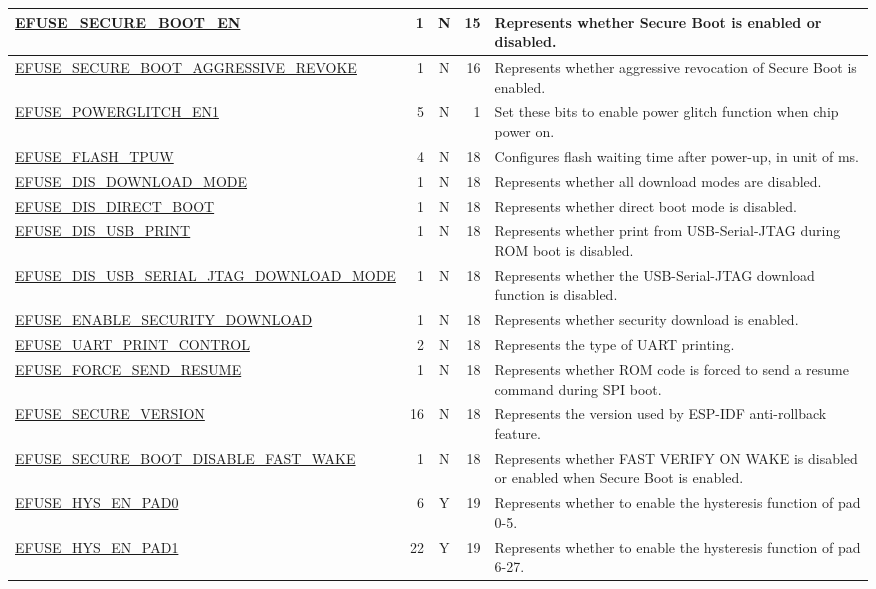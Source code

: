\begin{longtable}[l]{ |m{8.2cm}|r|c|r|m{9cm}| }
    \hyperref[fielddesc:EFUSESECUREBOOTEN]{EFUSE\_SECURE\_BOOT\_EN}  & 1 & N & 15 & Represents whether Secure Boot is enabled or disabled. \\ \hline
    \hyperref[fielddesc:EFUSESECUREBOOTAGGRESSIVEREVOKE]{EFUSE\_SECURE\_BOOT\_AGGRESSIVE\_REVOKE}  & 1 & N & 16 & Represents whether aggressive revocation of Secure Boot is enabled. \\ \hline
    \hyperref[fielddesc:EFUSEPOWERGLITCHEN1]{EFUSE\_POWERGLITCH\_EN1}  & 5 & N & 1 & Set these bits to enable power glitch function when chip power on. \\ \hline
    \hyperref[fielddesc:EFUSEFLASHTPUW]{EFUSE\_FLASH\_TPUW}  & 4 & N & 18 & Configures flash waiting time after power-up, in unit of ms. \\ \hline
    \hyperref[fielddesc:EFUSEDISDOWNLOADMODE]{EFUSE\_DIS\_DOWNLOAD\_MODE}  & 1 & N & 18 & Represents whether all download modes are disabled. \\ \hline
    \hyperref[fielddesc:EFUSEDISDIRECTBOOT]{EFUSE\_DIS\_DIRECT\_BOOT}  & 1 & N & 18 & Represents whether direct boot mode is disabled. \\ \hline
    \hyperref[fielddesc:EFUSEDISUSBPRINT]{EFUSE\_DIS\_USB\_PRINT}  & 1 & N & 18 & Represents whether print from USB-Serial-JTAG during ROM boot is disabled. \\ \hline
    \hyperref[fielddesc:EFUSEDISUSBSERIALJTAGDOWNLOADMODE]{EFUSE\_DIS\_USB\_SERIAL\_JTAG\_DOWNLOAD\_MODE}  & 1 & N & 18 & Represents whether the USB-Serial-JTAG download function is disabled. \\ \hline
    \hyperref[fielddesc:EFUSEENABLESECURITYDOWNLOAD]{EFUSE\_ENABLE\_SECURITY\_DOWNLOAD}  & 1 & N & 18 & Represents whether security download is enabled. \\ \hline
    \hyperref[fielddesc:EFUSEUARTPRINTCONTROL]{EFUSE\_UART\_PRINT\_CONTROL}  & 2 & N & 18 & Represents the type of UART printing. \\ \hline
    \hyperref[fielddesc:EFUSEFORCESENDRESUME]{EFUSE\_FORCE\_SEND\_RESUME}  & 1 & N & 18 & Represents whether ROM code is forced to send a resume command during SPI boot. \\ \hline
    \hyperref[fielddesc:EFUSESECUREVERSION]{EFUSE\_SECURE\_VERSION}  & 16 & N & 18 & Represents the version used by ESP-IDF anti-rollback feature. \\ \hline
    \hyperref[fielddesc:EFUSESECUREBOOTDISABLEFASTWAKE]{EFUSE\_SECURE\_BOOT\_DISABLE\_FAST\_WAKE}  & 1 & N & 18 & Represents whether FAST VERIFY ON WAKE is disabled or enabled when Secure Boot is enabled. \\ \hline
    \hyperref[fielddesc:EFUSEHYSENPAD0]{EFUSE\_HYS\_EN\_PAD0}  & 6 & Y & 19 & Represents whether to enable the hysteresis function of pad 0-5. \\ \hline
    \hyperref[fielddesc:EFUSEHYSENPAD1]{EFUSE\_HYS\_EN\_PAD1}  & 22 & Y & 19 & Represents whether to enable the hysteresis function of pad 6-27. \\ \hline

\end{longtable}
